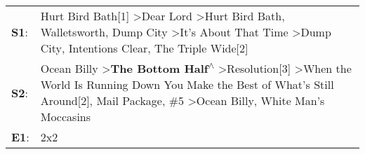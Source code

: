 \begin{supertabular}{p{0.03\textwidth}p{0.92\textwidth}}
 \textbf{S1}:  &                          Hurt Bird Bath[1]\textsuperscript{} \textgreater \enspace Dear Lord\textsuperscript{} \textgreater \enspace Hurt Bird Bath\textsuperscript{}, \enspace Walletsworth\textsuperscript{}, \enspace Dump City\textsuperscript{} \textgreater \enspace It's About That Time\textsuperscript{} \textgreater \enspace Dump City\textsuperscript{}, \enspace Intentions Clear\textsuperscript{}, \enspace The Triple Wide[2]\textsuperscript{}  \enspace  \\
 \textbf{S2}:  &  Ocean Billy\textsuperscript{} \textgreater \enspace \textbf{The Bottom Half\textsuperscript{$\wedge$}} \textgreater \enspace Resolution[3]\textsuperscript{} \textgreater \enspace When the World Is Running Down You Make the Best of What's Still Around[2]\textsuperscript{}, \enspace Mail Package\textsuperscript{}, \enspace \#5\textsuperscript{} \textgreater \enspace Ocean Billy\textsuperscript{}, \enspace White Man's Moccasins\textsuperscript{}  \enspace  \\
 \textbf{E1}:  &                                                                                                                                                                                                                                                                                                                                                                                                                                           2x2\textsuperscript{}  \enspace  \\
\end{supertabular}
